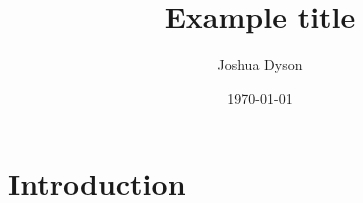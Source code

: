 \documentclass[a4paper]{article}
\title{Example title}
\author{Joshua Dyson}
\date{\today}
\begin{document}
    \maketitle

    \section{Introduction}
    

    \printbibliography
\end{document}
